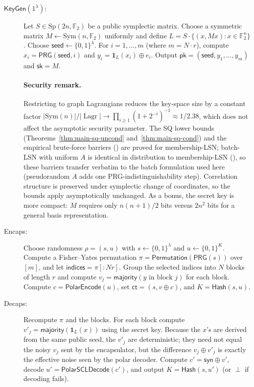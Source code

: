 \documentclass[11pt,a4paper]{article}
\theoremstyle{plain}
\theoremstyle{definition}
\newcommand{\F}{\mathbb{F}}
\DeclareMathOperator{\Lagr}{Lagr}
\begin{document}
\begin{description}
\item[$\mathsf{KeyGen}(1^\lambda)$:] Let $S \in \mathrm{Sp}(2n,\F_2)$ be a public symplectic matrix. Choose a symmetric matrix $M \leftarrow \mathrm{Sym}(n,\F_2)$ uniformly and define $L = S \cdot \{(x,Mx) : x \in \F_2^n\}$. Choose $\mathsf{seed} \leftarrow \{0,1\}^\lambda$. For $i=1,\dots,m$ (where $m=N \cdot r$), compute $x_i = \mathsf{PRG}(\mathsf{seed}, i)$ and $y_i = \mathbf{1}_L(x_i) \oplus e_i$. Output $\mathsf{pk} = (\mathsf{seed}, y_1,\dots,y_m)$ and $\mathsf{sk} = M$.

\paragraph{Security remark.} Restricting to graph Lagrangians reduces the key-space size by a constant factor $|\mathrm{Sym}(n)| / |\Lagr| \to \prod_{i\ge1}(1+2^{-i})^{-1}\approx1/2.38$, which does not affect the asymptotic security parameter. The SQ lower bounds (Theorems~\ref{thm:main-sq-uncond} and~\ref{thm:main-sq-cond}) and the empirical brute-force barriers () are proved for membership-LSN; batch-LSN with uniform $A$ is identical in distribution to membership-LSN (), so these barriers transfer verbatim to the batch formulation used here (pseudorandom $A$ adds one PRG-indistinguishability step). Correlation structure is preserved under symplectic change of coordinates, so the bounds apply asymptotically unchanged. As a bonus, the secret key is more compact: $M$ requires only $n(n+1)/2$ bits versus $2n^2$ bits for a general basis representation.

\item[Encaps:] Choose randomness $\rho=(s,u)$ with $s \leftarrow \{0,1\}^\lambda$ and $u \leftarrow \{0,1\}^K$. Compute a Fisher--Yates permutation $\pi = \mathsf{Permutation}(\mathsf{PRG}(s))$ over $[m]$, and let $\mathsf{indices} = \pi[:Nr]$. Group the selected indices into $N$ blocks of length $r$ and compute $v_j = \mathsf{majority}(y \text{ in block } j)$ for each block. Compute $c = \mathsf{PolarEncode}(u)$, set $\mathsf{ct} = (s, v \oplus c)$, and $K = \mathsf{Hash}(s, u)$.

\item[Decaps:] Recompute $\pi$ and the blocks. For each block compute $v'_j = \mathsf{majority}(\mathbf{1}_L(x))$ using the secret key. Because the $x$'s are derived from the same public seed, the $v'_j$ are deterministic; they need not equal the noisy $v_j$ sent by the encapsulator, but the difference $v_j \oplus v'_j$ is exactly the effective noise seen by the polar decoder. Compute $c' = \mathsf{syn} \oplus v'$, decode $u' = \mathsf{PolarSCLDecode}(c')$, and output $K = \mathsf{Hash}(s, u')$ (or $\perp$ if decoding fails).
\end{description}
\end{document}
